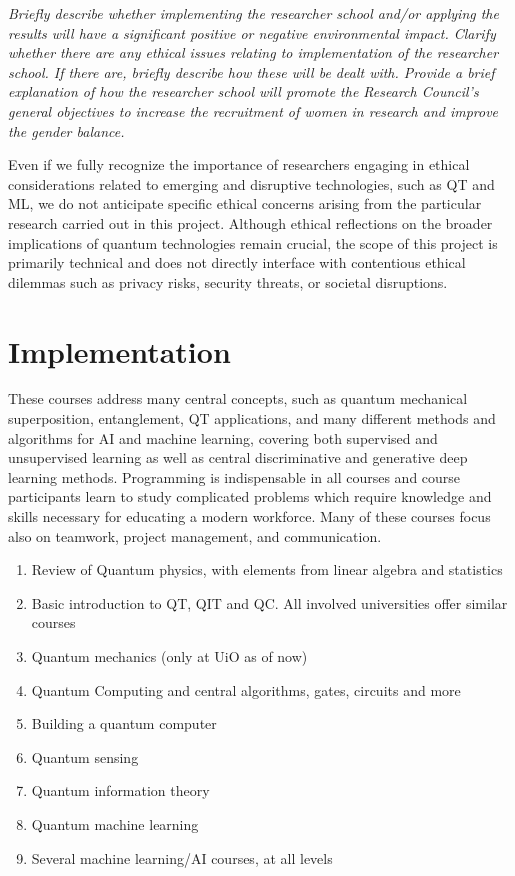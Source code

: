 \documentclass{scrreprt}
\begin{document}
{\em Briefly describe whether implementing the researcher school and/or applying the results will have a significant positive or negative environmental impact. Clarify whether there are any ethical issues relating to implementation of the researcher school. If there are, briefly describe how these will be dealt with. Provide a brief explanation of how the researcher school will promote the Research Council’s general objectives to increase the recruitment of women in research and improve the gender balance.}



Even if we fully recognize the importance of researchers engaging in
ethical considerations related to emerging and disruptive
technologies, such as QT and ML, we do not anticipate specific ethical
concerns arising from the particular research carried out in this
project. Although ethical reflections on the broader implications of
quantum technologies remain crucial, the scope of this project is
primarily technical and does not directly interface with contentious
ethical dilemmas such as privacy risks, security threats, or societal
disruptions.



\section{Implementation}

These courses address many central concepts, such as quantum
mechanical superposition, entanglement, QT applications, and many
different methods and algorithms for AI and machine learning, covering
both supervised and unsupervised learning as well as central
discriminative and generative deep learning methods. Programming is
indispensable in all courses and course participants learn to
study complicated problems which require knowledge and skills
necessary for educating a modern workforce. Many of these courses
focus also on teamwork, project management, and communication.



\begin{enumerate}
\item Review of Quantum physics, with elements from linear algebra and statistics
\item Basic introduction to QT, QIT and QC. All involved universities offer similar courses
\item Quantum mechanics (only at UiO as of now)
\item Quantum Computing and central algorithms, gates, circuits and more
\item Building a quantum computer
\item Quantum sensing
\item Quantum information theory
\item Quantum machine learning
\item Several  machine learning/AI courses, at all levels
\end{enumerate}
\end{document}
